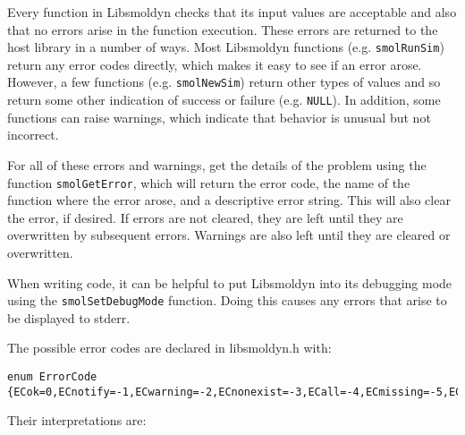 \documentclass {book}
\begin{document}
Every function in Libsmoldyn checks that its input values are acceptable and also that no errors arise in the function execution.  These errors are returned to the host library in a number of ways.  Most Libsmoldyn functions (e.g. \texttt{smolRunSim}) return any error codes directly, which makes it easy to see if an error arose.  However, a few functions (e.g. \texttt{smolNewSim}) return other types of values and so return some other indication of success or failure (e.g. \texttt{NULL}).  In addition, some functions can raise warnings, which indicate that behavior is unusual but not incorrect.

For all of these errors and warnings, get the details of the problem using the function \texttt{smolGetError}, which will return the error code, the name of the function where the error arose, and a descriptive error string.  This will also clear the error, if desired.  If errors are not cleared, they are left until they are overwritten by subsequent errors.  Warnings are also left until they are cleared or overwritten.

When writing code, it can be helpful to put Libsmoldyn into its debugging mode using the \texttt{smolSetDebugMode} function.  Doing this causes any errors that arise to be displayed to stderr.

The possible error codes are declared in libsmoldyn.h with:

\begin{lstlisting}
enum ErrorCode {ECok=0,ECnotify=-1,ECwarning=-2,ECnonexist=-3,ECall=-4,ECmissing=-5,ECbounds=-6,ECsyntax=-7,ECerror=-8,ECmemory=-9,ECbug=-10,ECsame=-11};
\end{lstlisting}

Their interpretations are:
\end{document}

